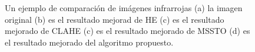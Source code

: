 \documentclass[a4paper, 11 pt, conference]{ieeeconf}      %
\begin{document}
\begin{figure}
    \centering
     \\
    \\
    \caption{Un ejemplo de comparaci\'on de im\'agenes infrarrojas (a) la imagen original (b) es el resultado mejorad de HE (c) es el resultado mejorado de CLAHE (c) es el resultado mejorado de MSSTO (d) es el resultado mejorado del algoritmo propuesto.}
    \label{fig:fig3}

\end{figure}
\end{document}
